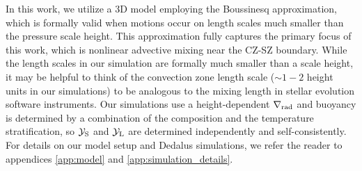 In this work, we utilize a 3D model employing the Boussinesq approximation, which is formally valid when motions occur on length scales much smaller than the pressure scale height.
This approximation fully captures the primary focus of this work, which is nonlinear advective mixing near the CZ-SZ boundary.
While the length scales in our simulation are formally much smaller than a scale height, it may be helpful to think of the convection zone length scale ($\sim 1-2$ height units in our simulations) to be analogous to the mixing length in stellar evolution software instruments.
Our simulations use a height-dependent $\nabla_{\rm{rad}}$ and buoyancy is determined by a combination of the composition and the temperature stratification, so $\mathcal{Y}_{\rm{S}}$ and $\mathcal{Y}_{\rm{L}}$ are determined independently and self-consistently.
For details on our model setup and Dedalus \citep{burns_etal_2020} simulations, we refer the reader to appendices \ref{app:model} and \ref{app:simulation_details}.
